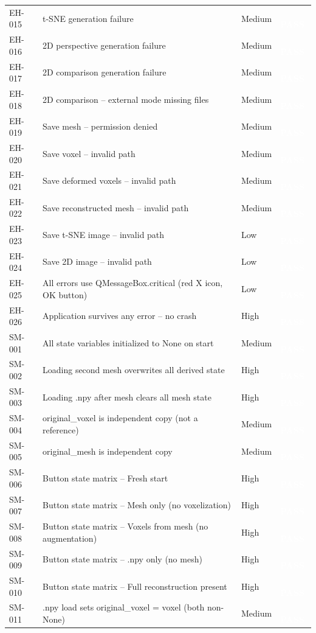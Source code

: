 \documentclass[12pt,a4paper]{article}
\newcommand{\statuspass}{\colorbox{statusgreen}{\textcolor{white}{\textbf{\,PASS\,}}}}
\begin{document}
{\begin{longtable}{p{1.7cm}p{7.7cm}p{1.3cm}p{2cm}}
EH-015 & t-SNE generation failure & Medium & \statuspass \\
EH-016 & 2D perspective generation failure & Medium & \statuspass \\
EH-017 & 2D comparison generation failure & Medium & \statuspass \\
EH-018 & 2D comparison -- external mode missing files & Medium & \statuspass \\
EH-019 & Save mesh -- permission denied & Medium & \statuspass \\
EH-020 & Save voxel -- invalid path & Medium & \statuspass \\
EH-021 & Save deformed voxels -- invalid path & Medium & \statuspass \\
EH-022 & Save reconstructed mesh -- invalid path & Medium & \statuspass \\
EH-023 & Save t-SNE image -- invalid path & Low & \statuspass \\
EH-024 & Save 2D image -- invalid path & Low & \statuspass \\
EH-025 & All errors use QMessageBox.critical (red X icon, OK button) & Low & \statuspass \\
EH-026 & Application survives any error -- no crash & High & \statuspass \\
SM-001 & All state variables initialized to None on start & Medium & \statuspass \\
SM-002 & Loading second mesh overwrites all derived state & High & \statuspass \\
SM-003 & Loading .npy after mesh clears all mesh state & High & \statuspass \\
SM-004 & original\_voxel is independent copy (not a reference) & Medium & \statuspass \\
SM-005 & original\_mesh is independent copy & Medium & \statuspass \\
SM-006 & Button state matrix -- Fresh start & High & \statuspass \\
SM-007 & Button state matrix -- Mesh only (no voxelization) & High & \statuspass \\
SM-008 & Button state matrix -- Voxels from mesh (no augmentation) & High & \statuspass \\
SM-009 & Button state matrix -- .npy only (no mesh) & High & \statuspass \\
SM-010 & Button state matrix -- Full reconstruction present & High & \statuspass \\
SM-011 & .npy load sets original\_voxel = voxel (both non-None) & Medium & \statuspass \\

\end{longtable}}
\end{document}
